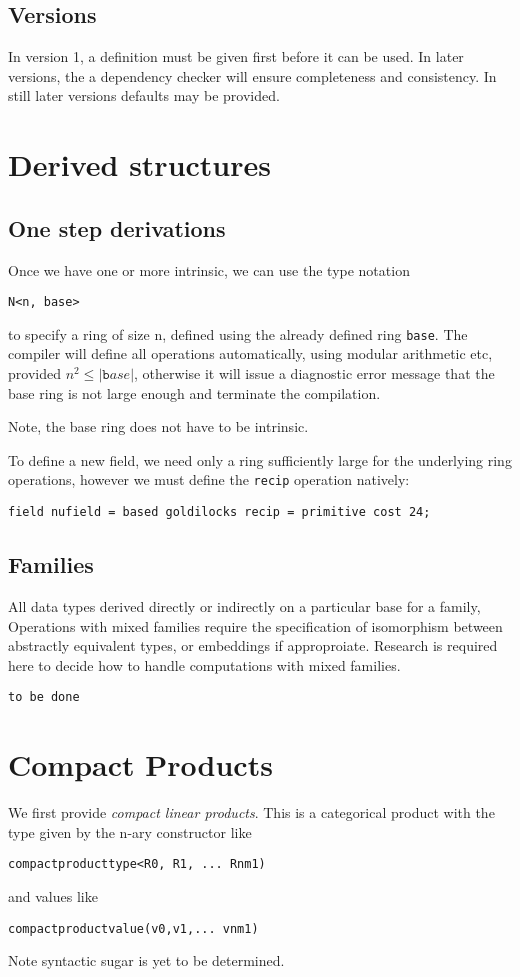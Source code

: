 \documentclass[oneside]{book}
\theoremstyle{plain}
\theoremstyle{definition}
\theoremstyle{plain}
\begin{document}
\subsection{Versions}
In version 1, a definition must be given first before it can be used.
In later versions, the a dependency checker will ensure completeness
and consistency. In still later versions defaults may be provided.

\section{Derived structures}
\subsection{One step derivations}
Once we have one or more intrinsic, we can use the type notation
\begin{verbatim}
N<n, base>
\end{verbatim}
to specify a ring of size n, defined using the already defined ring \verb$base$.
The compiler will define all operations automatically, using modular arithmetic
etc, provided $n^2\leq |{\mathtt base}|$, otherwise it will issue a diagnostic
error message that the base ring is not large enough and terminate the compilation.

Note, the base ring does not have to be intrinsic.

To define a new field, we need only a ring sufficiently large for the underlying
ring operations, however we must define the \verb$recip$ operation natively:
\begin{verbatim}
field nufield = based goldilocks recip = primitive cost 24;
\end{verbatim}

\subsection{Families}
All data types derived directly or indirectly on a particular
base for a family, Operations with mixed families require
the specification of isomorphism between abstractly equivalent types,
or embeddings if approproiate. Research is required here to decide
how to handle computations with mixed families.
\begin{verbatim}
to be done
\end{verbatim}

\section{Compact Products}
We first provide {\em compact linear products}. This is a categorical product
with the type given by the n-ary constructor like
\begin{verbatim}
compactproducttype<R0, R1, ... Rnm1)
\end{verbatim}
and values like
\begin{verbatim}
compactproductvalue(v0,v1,... vnm1)
\end{verbatim}
Note syntactic sugar is yet to be determined.
\end{document}
